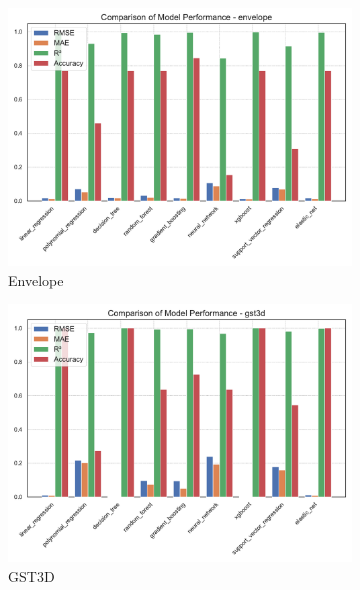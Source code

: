 \begin{figure}[htbp]
    \centering
    \begin{subfigure}[t]{0.32\textwidth}
        \includegraphics[width=\textwidth]{assets/images/05/performance_by_model_envelope}
        \caption{Envelope}
    \end{subfigure}
    \hfill
    \begin{subfigure}[t]{0.32\textwidth}
        \includegraphics[width=\textwidth]{assets/images/05/performance_by_model_gst3d}
        \caption{\ac{GST3D}}
    \end{subfigure}
    \hfill
    \begin{subfigure}[t]{0.32\textwidth}

\end{subfigure}
\end{figure}
